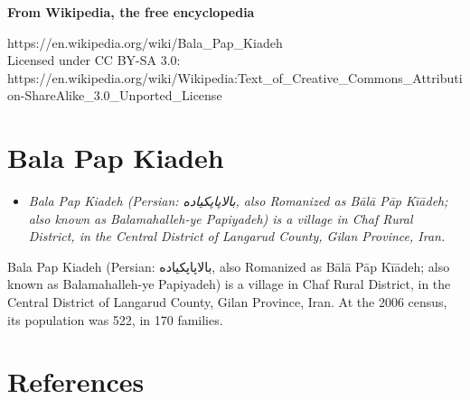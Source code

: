 \textbf{From Wikipedia, the free encyclopedia}

https://en.wikipedia.org/wiki/Bala\_Pap\_Kiadeh\\
Licensed under CC BY-SA 3.0:\\
https://en.wikipedia.org/wiki/Wikipedia:Text\_of\_Creative\_Commons\_Attribution-ShareAlike\_3.0\_Unported\_License

\section{Bala Pap Kiadeh}\label{bala-pap-kiadeh}

\begin{itemize}
\item
  \emph{Bala Pap Kiadeh (Persian: بالاپاپكياده‎, also Romanized as Bālā
  Pāp Kīādeh; also known as Balamahalleh-ye Papiyadeh) is a village in
  Chaf Rural District, in the Central District of Langarud County, Gilan
  Province, Iran.}
\end{itemize}

Bala Pap Kiadeh (Persian: بالاپاپكياده‎, also Romanized as Bālā Pāp
Kīādeh; also known as Balamahalleh-ye Papiyadeh) is a village in Chaf
Rural District, in the Central District of Langarud County, Gilan
Province, Iran. At the 2006 census, its population was 522, in 170
families.

\section{References}\label{references}
